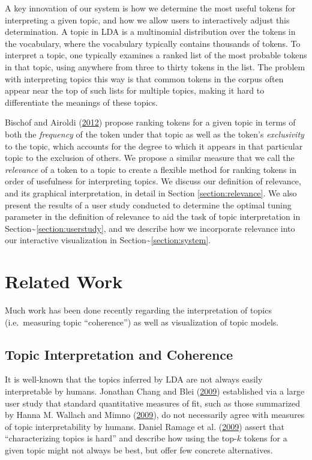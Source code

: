 \documentclass[12pt,]{isuthesis}
\begin{document}
A key innovation of our system is how we determine the most useful
tokens for interpreting a given topic, and how we allow users to
interactively adjust this determination. A topic in LDA is a multinomial
distribution over the tokens in the vocabulary, where the vocabulary
typically contains thousands of tokens. To interpret a topic, one
typically examines a ranked list of the most probable tokens in that
topic, using anywhere from three to thirty tokens in the list. The
problem with interpreting topics this way is that common tokens in the
corpus often appear near the top of such lists for multiple topics,
making it hard to differentiate the meanings of these topics.

Bischof and Airoldi (\protect\hyperlink{ref-Bischof}{2012}) propose
ranking tokens for a given topic in terms of both the \emph{frequency}
of the token under that topic as well as the token's \emph{exclusivity}
to the topic, which accounts for the degree to which it appears in that
particular topic to the exclusion of others. We propose a similar
measure that we call the \emph{relevance} of a token to a topic to
create a flexible method for ranking tokens in order of usefulness for
interpreting topics. We discuss our definition of relevance, and its
graphical interpretation, in detail in Section \ref{section:relevance}.
We also present the results of a user study conducted to determine the
optimal tuning parameter in the definition of relevance to aid the task
of topic interpretation in
Section\textasciitilde{}\ref{section:userstudy}, and we describe how we
incorporate relevance into our interactive visualization in
Section\textasciitilde{}\ref{section:system}.

\section{Related Work}\label{section:relatedwork}

Much work has been done recently regarding the interpretation of topics
(i.e.~measuring topic ``coherence'') as well as visualization of topic
models.

\subsection{Topic Interpretation and Coherence}

It is well-known that the topics inferred by LDA are not always easily
interpretable by humans. Jonathan Chang and Blei
(\protect\hyperlink{ref-Chang}{2009}) established via a large user study
that standard quantitative measures of fit, such as those summarized by
Hanna M. Wallach and Mimno (\protect\hyperlink{ref-Wallach}{2009}), do
not necessarily agree with measures of topic interpretability by humans.
Daniel Ramage et al. (\protect\hyperlink{ref-Ramage}{2009}) assert that
``characterizing topics is hard'' and describe how using the top-\(k\)
tokens for a given topic might not always be best, but offer few
concrete alternatives.
\end{document}
